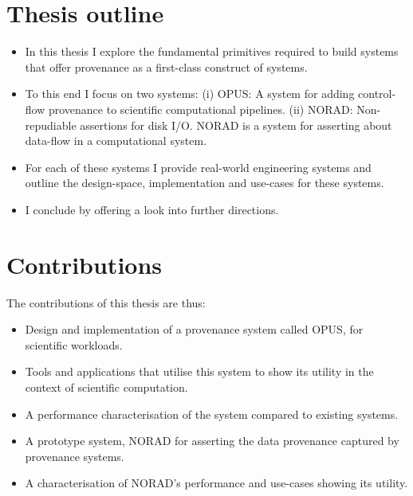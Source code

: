 \documentclass[withindex,glossary]{cam-thesis}
\begin{document}
\section{Thesis outline}
\begin{itemize}
\item In this thesis I explore the fundamental primitives required to build systems that offer provenance as a first-class construct
of systems.
\item To this end I focus on two systems:
(i) OPUS: A system for adding control-flow provenance to scientific computational pipelines.
(ii) NORAD: Non-repudiable assertions for disk I/O. NORAD is a system for asserting about data-flow in a computational system.
\item For each of these systems I provide real-world engineering systems and outline the design-space, implementation and use-cases for these systems.
\item I conclude by offering a look into further directions.
\end{itemize}

\section{Contributions}
The contributions of this thesis are thus:
\begin{itemize}
\item Design and implementation of a provenance system called OPUS, for scientific workloads.
\item Tools and applications that utilise this system to show its utility in the context of scientific computation.
\item A performance characterisation of the system compared to existing systems.
\item A prototype system, NORAD for asserting the data provenance captured by provenance systems.
\item A characterisation of NORAD's performance and use-cases showing its utility.
\end{itemize}
\end{document}
